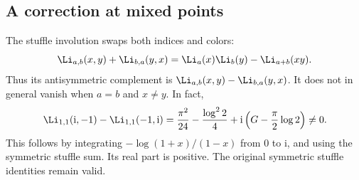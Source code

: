 \subsection{A correction at mixed points}
The stuffle involution swaps both indices and colors:
\[
 \Li_{a,b}(x,y)+\Li_{b,a}(y,x)
 =\Li_a(x)\Li_b(y)-\Li_{a+b}(xy).
\]
Thus its antisymmetric complement is
$\Li_{a,b}(x,y)-\Li_{b,a}(y,x)$. It does not in general vanish
when $a=b$ and $x\ne y$. In fact,
\[
 \Li_{1,1}(\mathrm i,-1)-\Li_{1,1}(-1,\mathrm i)
 =\frac{\pi^2}{24}-\frac{\log^2 2}{4}
 +\mathrm i\left(G-\frac\pi2\log2\right)\ne0.
\]
This follows by integrating $-\log(1+x)/(1-x)$ from $0$ to
$\mathrm i$, and using the symmetric stuffle sum. Its real part is
positive. The original symmetric stuffle identities remain valid.

